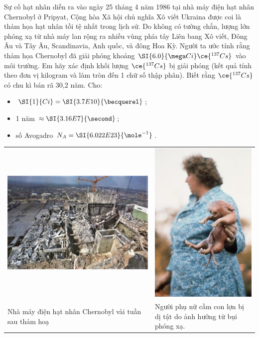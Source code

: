 \begin{ex}
	Sự cố hạt nhân diễn ra vào ngày 25 tháng 4 năm 1986 tại nhà máy điện hạt nhân Chernobyl ở Pripyat, Cộng hòa Xã hội chủ nghĩa Xô viết Ukraina được coi là thảm họa hạt nhân tồi tệ nhất trong lịch sử. Do không có tường chắn, lượng lớn phóng xạ từ nhà máy lan rộng ra nhiều vùng phía tây Liên bang Xô viết, Đông Âu và Tây Âu, Scandinavia, Anh quốc, và đông Hoa Kỳ. Người ta ước tính rằng thảm họa Chernobyl đã giải phóng khoảng $\SI{6.0}{\mega Ci} \ce{^{137}Cs}$ vào môi trường. Em hãy xác định khối lượng $\ce{^{137}Cs}$ bị giải phóng (kết quả tính theo đơn vị kilogram và làm tròn đến 1 chữ số thập phân). Biết rằng $\ce{^{137}Cs}$ có chu kì bán rã 30,2 năm. Cho:	
	\begin{itemize}
		\item $\SI{1}{Ci}=\SI{3.7E10}{\becquerel}$;
		\item 1 năm $\approx\SI{3.16E7}{\second}$;
		\item số Avogadro $N_A=\SI{6.022E23}{\mole^{-1}}$.
	\end{itemize}
	\begin{center}
		\begin{tabular}{C{6cm}C{6cm}}
			\includegraphics[width=0.8\linewidth]{../figs/VN12-Y24-PH-SYL-032P-3}
			& \includegraphics[width=0.4\linewidth]{../figs/VN12-Y24-PH-SYL-032P-4}\\
			Nhà máy điện hạt nhân Chernobyl vài tuần sau thảm hoạ & Người phụ nữ cầm con lợn bị dị tật do ảnh hưởng từ bụi phóng xạ.
		\end{tabular}
		

\end{center}
\end{ex}
